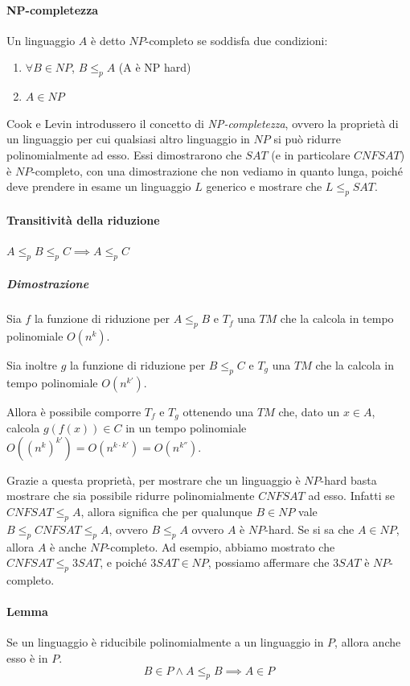 \paragraph{NP-completezza}
Un linguaggio $A$ è detto $NP$-completo se soddisfa due condizioni:
\begin{enumerate}
    \item $\forall B \in NP$, $B \leq_{p} A$ (A è NP hard)
    \item $A \in NP$
\end{enumerate}
Cook e Levin introdussero il concetto di \textit{NP-completezza}, ovvero la proprietà di un linguaggio per cui qualsiasi altro linguaggio in $NP$ si può ridurre polinomialmente ad esso. Essi dimostrarono che $SAT$ (e in particolare $CNFSAT$) è $NP$-completo, con una dimostrazione che non vediamo in quanto lunga, poiché deve prendere in esame un linguaggio $L$ generico e mostrare che $L \leq_p SAT$.

\paragraph{Transitività della riduzione} $A \leq_p B \leq_p C \implies A \leq_p C$

\subparagraph{Dimostrazione}
Sia $f$ la funzione di riduzione per $A \leq_p B$ e $T_f$ una $TM$ che la calcola in tempo polinomiale $O(n^k)$. 

Sia inoltre $g$ la funzione di riduzione per $B \leq_p C$ e $T_g$ una $TM$ che la calcola in tempo polinomiale $O(n^{k'})$.

Allora è possibile comporre $T_f$ e $T_g$ ottenendo una $TM$ che, dato un $x \in A$, calcola $g(f(x)) \in C$ in un tempo polinomiale $O((n^k)^{k'}) = O(n^{k \cdot k'}) = O(n^{k''})$.

Grazie a questa proprietà, per mostrare che un linguaggio è $NP$-hard basta mostrare che sia possibile ridurre polinomialmente $CNFSAT$ ad esso. Infatti se $CNFSAT \leq_p A$, allora significa che per qualunque $B \in NP$ vale $B \leq_p CNFSAT \leq_p A$, ovvero $B \leq_p A$ ovvero $A$ è $NP$-hard. Se si sa che $A \in NP$, allora $A$ è anche $NP$-completo. Ad esempio, abbiamo mostrato che $CNFSAT \leq_p 3SAT$, e poiché $3SAT \in NP$, possiamo affermare che $3SAT$ è $NP$-completo.

\paragraph{Lemma}
Se un linguaggio è riducibile polinomialmente a un linguaggio in $P$, allora anche esso è in $P$.
\[
        B \in P \land A \leq_{p} B \implies A \in P
\]

